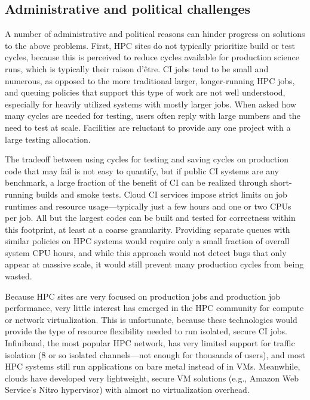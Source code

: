 \documentclass{IEEEcsmag}
\begin{document}
\subsection{Administrative and political challenges}

A number of administrative and political reasons can hinder
progress on solutions to the above problems.
First, HPC sites do not typically prioritize build
or test cycles, because this is perceived to reduce cycles available
for production science runs, which is typically their raison d'\^etre. CI jobs tend
to be small and numerous, as opposed to the
more traditional larger, longer-running HPC jobs, and queuing policies that support this type of
work are not well understood, especially for heavily utilized systems with mostly larger jobs.
When asked how many cycles are needed for testing, users often reply with large numbers and
the need to test at scale. Facilities are reluctant to provide any one project
with a large testing allocation.

The tradeoff between using cycles for testing and saving cycles on production code that
may fail is not easy to quantify, but if public CI systems are any benchmark, a large
fraction of the benefit of CI can be realized through short-running builds and smoke
tests. Cloud CI services impose strict limits on job runtimes and resource
usage---typically just a few hours and one or two CPUs per job. All but the
largest codes can be built and tested for correctness within this footprint, at least at
a coarse granularity. Providing separate queues with similar policies on HPC systems
would require only a small fraction of overall system CPU hours, and while this approach
would not detect bugs that only appear at massive scale, it would still prevent many
production cycles from being wasted.

Because HPC sites are very focused on production jobs and production job performance,
very little interest has emerged in the HPC community for compute or network
virtualization. This is unfortunate, because these technologies would provide the type
of resource flexibility needed to run isolated, secure CI jobs. Infiniband, the most
popular HPC network, has very limited support for traffic isolation (8 or so isolated
channels---not enough for thousands of users), and most HPC systems still run
applications on bare metal instead of in VMs. Meanwhile, clouds have developed very
lightweight, secure VM solutions (e.g., Amazon Web Service's Nitro hypervisor) with
almost no virtualization overhead.
\end{document}
